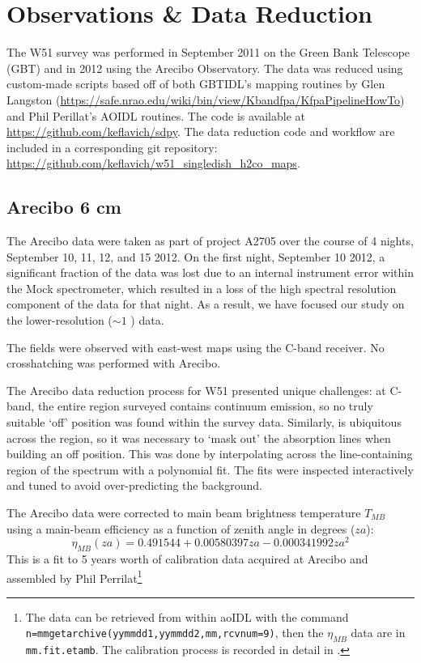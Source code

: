 \section{Observations \& Data Reduction}
\label{sec:observations}
The W51 survey was performed in September 2011 on the Green Bank Telescope
(GBT) and in 2012 using the Arecibo Observatory.  
The data was reduced using custom-made scripts based off of both GBTIDL's
mapping routines by Glen Langston
(\url{https://safe.nrao.edu/wiki/bin/view/Kbandfpa/KfpaPipelineHowTo}) and Phil
Perillat's AOIDL routines.  The code is available at
\url{https://github.com/keflavich/sdpy}.  The data reduction code and workflow
are included in a corresponding git repository:
\url{https://github.com/keflavich/w51_singledish_h2co_maps}.

\subsection{Arecibo 6 cm}
The Arecibo data were taken as part of project A2705 over the course of 4
nights, September 10, 11, 12, and 15 2012.   On the first night, September 10
2012, a significant fraction of the data was lost due to an internal instrument
error within the Mock spectrometer, which resulted in a loss of the
high spectral resolution component of the \formaldehyde data for that night.  As a
result, we have focused our study on the lower-resolution ($\sim1$ \kms) data.

The fields were observed with east-west maps using the C-band receiver.  No
crosshatching was performed with Arecibo.

The Arecibo data reduction process for W51
presented unique challenges: at C-band, the entire region surveyed contains
continuum emission, so no truly suitable `off' position was found within the
survey data.  Similarly, \formaldehyde is ubiquitous across the region, so it
was necessary to `mask out' the absorption lines when building an off position.
This was done by interpolating across the line-containing region of the
spectrum with a polynomial fit.  The fits were inspected interactively and
tuned to avoid over-predicting the background.

The Arecibo data were corrected to main beam brightness temperature $T_{MB}$
using a main-beam efficiency as a function of zenith angle in degrees ($za$):
$$\eta_{MB}(za) = 0.491544 + 0.00580397 za - 0.000341992 za^2$$
This is a fit to 5 years worth of calibration data acquired at Arecibo and
assembled by Phil Perrilat\footnote{The data can be retrieved from within aoIDL
with the command \texttt{n=mmgetarchive(yymmdd1,yymmdd2,mm,rcvnum=9)}, then
the $\eta_{MB}$ data are in \texttt{mm.fit.etamb}.  The calibration process is
recorded in detail in \citet{Heiles2001a}.}


